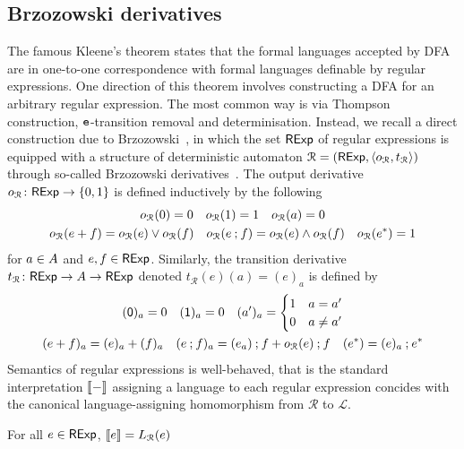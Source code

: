 \subsection{Brzozowski derivatives}\label{c2:subsec:brzozowski_derivatives}
The famous Kleene's theorem states that the formal languages accepted by DFA are in one-to-one correspondence with formal languages definable by regular expressions. One direction of this theorem involves constructing a \textsf{DFA} for an arbitrary regular expression. The most common way is via Thompson construction, $\mathtt{e}$-transition removal and determinisation. Instead, we recall a direct construction due to Brzozowski~\cite{Brzozowski:1964:Expressions}, in which the set $\mathsf{RExp}$ of regular expressions is equipped with a structure of deterministic automaton $\mathcal{R} = (\mathsf{RExp}, \langle o_{\mathcal{R}}, t_{\mathcal{R}} \rangle)$ through so-called Brzozowski derivatives~\cite{Brzozowski:1964:Expressions}. The output derivative $o_{\mathcal{R}} \colon \mathsf{RExp} \to \{0, 1\}$ is defined inductively by the following 
\begin{gather*}
    o_{\mathcal{R}}(0) = 0 \quad o_{\mathcal{R}}(1) = 1 \quad o_{\mathcal{R}}(a) = 0 \\ o_{\mathcal{R}}(e + f) = o_{\mathcal{R}}(e) \vee o_{\mathcal{R}}(f) \quad
    o_{\mathcal{R}}(e \mathbin{;} f) = o_{\mathcal{R}}(e) \wedge o_{\mathcal{R}}(f) \quad o_{\mathcal{R}}(e^{\ast}) = 1
\end{gather*}
for $a \in {A}$ and $e,f \in \mathsf{RExp}$. Similarly, the transition derivative $t_{\mathcal{R}} \colon \mathsf{RExp} \to {A} \to \mathsf{RExp}$ denoted $t_{\mathcal{R}} (e)(a) = (e)_a$ is defined by
\begin{gather*}
    (\mathsf{0})_a = 0 \quad (\mathsf{1})_a = 0 \quad (a')_a = \begin{cases}
        1 & a = a'\\ 0 & a \neq a'  \end{cases}\\
    (e + f)_a = (e)_a + (f)_a \quad
    (e \mathbin{;} f)_a = (e_a) \mathbin{;} f + o_{\mathcal{R}}(e) \mathbin{;} f \quad (e^{\ast}) = (e)_a \mathbin{;} e^{\ast}
\end{gather*}
Semantics of regular expressions is well-behaved, that is the standard interpretation $\left\llbracket{-}\right\rrbracket$ assigning a language to each regular expression concides with the canonical language-assigning homomorphism from $\mathcal{R}$ to $\mathcal{L}$.
\begin{lemma}\label{c2:lem:adequacy}
    For all $e \in \mathsf{RExp}$, $\left\llbracket{e}\right\rrbracket = L_{\mathcal{R}}(e)$
\end{lemma}
